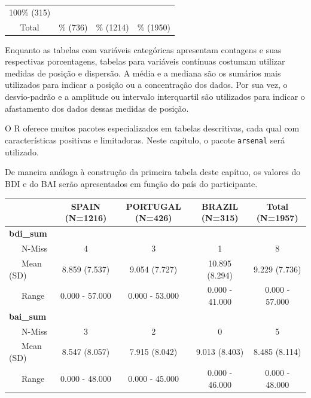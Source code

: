 \documentclass[
]{book}
\newenvironment{Shaded}{\begin{snugshade}}{\end{snugshade}}
\newcommand{\DataTypeTok}[1]{\textcolor[rgb]{0.13,0.29,0.53}{#1}}
\newcommand{\KeywordTok}[1]{\textcolor[rgb]{0.13,0.29,0.53}{\textbf{#1}}}
\newcommand{\NormalTok}[1]{#1}
\newcommand{\OperatorTok}[1]{\textcolor[rgb]{0.81,0.36,0.00}{\textbf{#1}}}
\newcommand{\OtherTok}[1]{\textcolor[rgb]{0.56,0.35,0.01}{#1}}
\newcommand{\StringTok}[1]{\textcolor[rgb]{0.31,0.60,0.02}{#1}}
\begin{document}
\begin{longtable}[]{@{}cccc@{}}
\begin{minipage}[t]{0.17\columnwidth}
100\% (315)\strut
\end{minipage}\tabularnewline
\begin{minipage}[t]{0.14\columnwidth}\centering
Total\strut
\end{minipage} & \begin{minipage}[t]{0.15\columnwidth}\centering
38\% (736)\strut
\end{minipage} & \begin{minipage}[t]{0.16\columnwidth}\centering
62\% (1214)\strut
\end{minipage} & \begin{minipage}[t]{0.17\columnwidth}\centering
100\% (1950)\strut
\end{minipage}\tabularnewline
\bottomrule
\end{longtable}

Enquanto as tabelas com variáveis categóricas apresentam contagens e suas respectivas porcentagens, tabelas para variáveis contínuas costumam utilizar medidas de posição e dispersão. A média e a mediana são os sumários mais utilizados para indicar a posição ou a concentração dos dados. Por sua vez, o desvio-padrão e a amplitude ou intervalo interquartil são utilizados para indicar o afastamento dos dados dessas medidas de posição.

O R oferece muitos pacotes especializados em tabelas descritivas, cada qual com características positivas e limitadoras. Neste capítulo, o pacote \texttt{arsenal} será utilizado.

De maneira análoga à construção da primeira tabela deste capítuo, os valores do BDI e do BAI serão apresentados em função do país do participante.

\begin{Shaded}
\end{Shaded}

\begin{longtable}[]{@{}lcccc@{}}
\toprule
& SPAIN (N=1216) & PORTUGAL (N=426) & BRAZIL (N=315) & Total (N=1957)\tabularnewline
\midrule
\endhead
\textbf{bdi\_sum} & & & &\tabularnewline
~~~N-Miss & 4 & 3 & 1 & 8\tabularnewline
~~~Mean (SD) & 8.859 (7.537) & 9.054 (7.727) & 10.895 (8.294) & 9.229 (7.736)\tabularnewline
~~~Range & 0.000 - 57.000 & 0.000 - 53.000 & 0.000 - 41.000 & 0.000 - 57.000\tabularnewline
\textbf{bai\_sum} & & & &\tabularnewline
~~~N-Miss & 3 & 2 & 0 & 5\tabularnewline
~~~Mean (SD) & 8.547 (8.057) & 7.915 (8.042) & 9.013 (8.403) & 8.485 (8.114)\tabularnewline
~~~Range & 0.000 - 48.000 & 0.000 - 45.000 & 0.000 - 46.000 & 0.000 - 48.000\tabularnewline
\bottomrule
\end{longtable}
\end{document}
